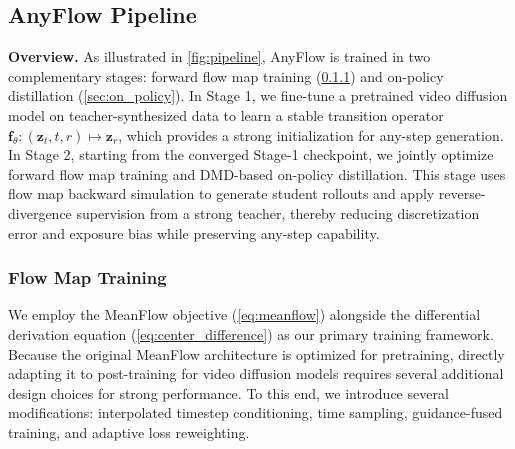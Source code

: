 \documentclass{llmxive}
\providecommand{\myPara}[1]{\noindent\textbf{#1}}
\providecommand{\mycomment}[1]{\# #1}
\providecommand{\func}[1]{\texttt{#1}}
\begin{document}
\subsection{AnyFlow Pipeline}
\label{sec:pipeline}

\myPara{Overview.} As illustrated in \cref{fig:pipeline}, AnyFlow is trained in two complementary stages: forward flow map training (\cref{sec:flow_map}) and on-policy distillation (\cref{sec:on_policy}). In Stage 1, we fine-tune a pretrained video diffusion model on teacher-synthesized data to learn a stable transition operator $\mathbf{f}_\theta:(\mathbf{z}_t, t, r) \mapsto \mathbf{z}_r$, which provides a strong initialization for any-step generation. In Stage 2, starting from the converged Stage-1 checkpoint, we jointly optimize forward flow map training and DMD-based on-policy distillation. This stage uses flow map backward simulation to generate student rollouts and apply reverse-divergence supervision from a strong teacher, thereby reducing discretization error and exposure bias while preserving any-step capability.


\subsubsection{Flow Map Training}
\label{sec:flow_map}

\noindent We employ the MeanFlow objective (\cref{eq:meanflow}) alongside the differential derivation equation (\cref{eq:center_difference}) as our primary training framework. Because the original MeanFlow architecture is optimized for pretraining, directly adapting it to post-training for video diffusion models requires several additional design choices for strong performance. To this end, we introduce several modifications: interpolated timestep conditioning, time sampling, guidance-fused training, and adaptive loss reweighting.


\renewcommand{\mycomment}[1]{\# #1}
\renewcommand{\func}[1]{\texttt{#1}}

\setlength{\algomargin}{0pt}
\setlength{\AlCapHSkip}{0pt}
\end{document}
